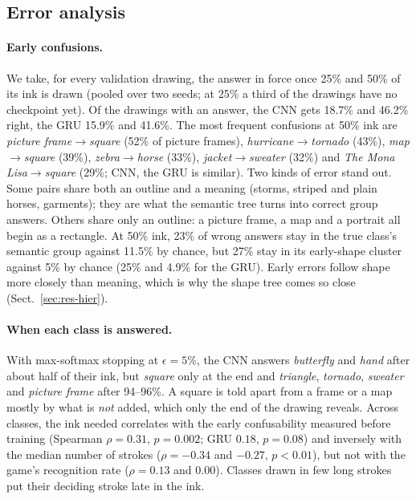 \subsection{Error analysis}
\label{sec:res-examples}

\paragraph{Early confusions.} We take, for every validation drawing, the answer in force once 25\%
and 50\% of its ink is drawn (pooled over two seeds; at 25\% a third of the drawings have no
checkpoint yet). Of the drawings with an answer, the CNN gets 18.7\% and 46.2\% right, the GRU 15.9\% and 41.6\%. The
most frequent confusions at 50\% ink are \emph{picture frame}$\to$\emph{square} (52\% of picture
frames), \emph{hurricane}$\to$\emph{tornado} (43\%), \emph{map}$\to$\emph{square} (39\%),
\emph{zebra}$\to$\emph{horse} (33\%), \emph{jacket}$\to$\emph{sweater} (32\%) and \emph{The Mona
Lisa}$\to$\emph{square} (29\%; CNN, the GRU is similar). Two kinds of error stand out. Some pairs
share both an outline and a meaning (storms, striped and plain horses, garments); they are what the
semantic tree turns into correct group answers. Others share only an outline: a picture frame, a map
and a portrait all begin as a rectangle. At 50\% ink, 23\% of wrong answers stay in the true class's
semantic group against 11.5\% by chance, but 27\% stay in its early-shape cluster against 5\% by chance
(25\% and 4.9\% for the GRU). Early errors follow shape more closely than meaning, which is why the
shape tree comes so close (Sect.~\ref{sec:res-hier}).

\paragraph{When each class is answered.} With max-softmax stopping at $\epsilon = 5\%$, the CNN answers
\emph{butterfly} and \emph{hand} after about half of their ink, but \emph{square} only at the end and
\emph{triangle}, \emph{tornado}, \emph{sweater} and \emph{picture frame} after 94--96\%. A square is
told apart from a frame or a map mostly by what is \emph{not} added, which only the end of the
drawing reveals. Across classes, the ink needed correlates with the early confusability measured
before training (Spearman $\rho = 0.31$, $p = 0.002$; GRU $0.18$, $p = 0.08$) and inversely with the
median number of strokes ($\rho = -0.34$ and $-0.27$, $p < 0.01$), but not with the game's
recognition rate ($\rho = 0.13$ and $0.00$). Classes drawn in few long strokes put their deciding
stroke late in the ink.

